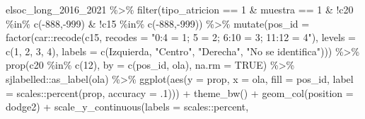 \documentclass[
  12pt,
]{book}
\newenvironment{Shaded}{\begin{snugshade}}{\end{snugshade}}
\newcommand{\AttributeTok}[1]{\textcolor[rgb]{0.77,0.63,0.00}{#1}}
\newcommand{\ConstantTok}[1]{\textcolor[rgb]{0.00,0.00,0.00}{#1}}
\newcommand{\DecValTok}[1]{\textcolor[rgb]{0.00,0.00,0.81}{#1}}
\newcommand{\FunctionTok}[1]{\textcolor[rgb]{0.00,0.00,0.00}{#1}}
\newcommand{\NormalTok}[1]{#1}
\newcommand{\SpecialCharTok}[1]{\textcolor[rgb]{0.00,0.00,0.00}{#1}}
\newcommand{\StringTok}[1]{\textcolor[rgb]{0.31,0.60,0.02}{#1}}
\begin{document}
\begin{Shaded}
\begin{Highlighting}[]
\NormalTok{elsoc\_long\_2016\_2021 }\SpecialCharTok{\%\textgreater{}\%}
  \FunctionTok{filter}\NormalTok{(tipo\_atricion }\SpecialCharTok{==} \DecValTok{1} \SpecialCharTok{\&}\NormalTok{ muestra }\SpecialCharTok{==} \DecValTok{1} \SpecialCharTok{\&} \SpecialCharTok{!}\NormalTok{c20 }\SpecialCharTok{\%in\%} \FunctionTok{c}\NormalTok{(}\SpecialCharTok{{-}}\DecValTok{888}\NormalTok{,}\SpecialCharTok{{-}}\DecValTok{999}\NormalTok{) }\SpecialCharTok{\&} \SpecialCharTok{!}\NormalTok{c15 }\SpecialCharTok{\%in\%} \FunctionTok{c}\NormalTok{(}\SpecialCharTok{{-}}\DecValTok{888}\NormalTok{,}\SpecialCharTok{{-}}\DecValTok{999}\NormalTok{)) }\SpecialCharTok{\%\textgreater{}\%}
  \FunctionTok{mutate}\NormalTok{(}\AttributeTok{pos\_id =} \FunctionTok{factor}\NormalTok{(car}\SpecialCharTok{::}\FunctionTok{recode}\NormalTok{(c15, }\AttributeTok{recodes =} \StringTok{"0:4 = 1; 5 = 2; 6:10 = 3; 11:12 = 4"}\NormalTok{),}
                       \AttributeTok{levels =} \FunctionTok{c}\NormalTok{(}\DecValTok{1}\NormalTok{, }\DecValTok{2}\NormalTok{, }\DecValTok{3}\NormalTok{, }\DecValTok{4}\NormalTok{),}
                       \AttributeTok{labels =} \FunctionTok{c}\NormalTok{(}\StringTok{\textquotesingle{}Izquierda\textquotesingle{}}\NormalTok{, }\StringTok{"Centro"}\NormalTok{, }\StringTok{"Derecha"}\NormalTok{, }\StringTok{"No se identifica"}\NormalTok{))) }\SpecialCharTok{\%\textgreater{}\%}
  \FunctionTok{prop}\NormalTok{(c20 }\SpecialCharTok{\%in\%} \FunctionTok{c}\NormalTok{(}\DecValTok{12}\NormalTok{), }\AttributeTok{by =} \FunctionTok{c}\NormalTok{(pos\_id, ola), }\AttributeTok{na.rm =} \ConstantTok{TRUE}\NormalTok{) }\SpecialCharTok{\%\textgreater{}\%} 
\NormalTok{  sjlabelled}\SpecialCharTok{::}\FunctionTok{as\_label}\NormalTok{(ola) }\SpecialCharTok{\%\textgreater{}\%}
  \FunctionTok{ggplot}\NormalTok{(}\FunctionTok{aes}\NormalTok{(}\AttributeTok{y =}\NormalTok{ prop, }\AttributeTok{x =}\NormalTok{ ola, }\AttributeTok{fill =}\NormalTok{ pos\_id, }
               \AttributeTok{label =}\NormalTok{ scales}\SpecialCharTok{::}\FunctionTok{percent}\NormalTok{(prop, }\AttributeTok{accuracy =}\NormalTok{ .}\DecValTok{1}\NormalTok{))) }\SpecialCharTok{+}
  \FunctionTok{theme\_bw}\NormalTok{() }\SpecialCharTok{+} 
    \FunctionTok{geom\_col}\NormalTok{(}\AttributeTok{position =} \StringTok{\textquotesingle{}dodge2\textquotesingle{}}\NormalTok{) }\SpecialCharTok{+}
    \FunctionTok{scale\_y\_continuous}\NormalTok{(}\AttributeTok{labels =}\NormalTok{ scales}\SpecialCharTok{::}\NormalTok{percent,}

\end{Highlighting}
\end{Shaded}
\end{document}
